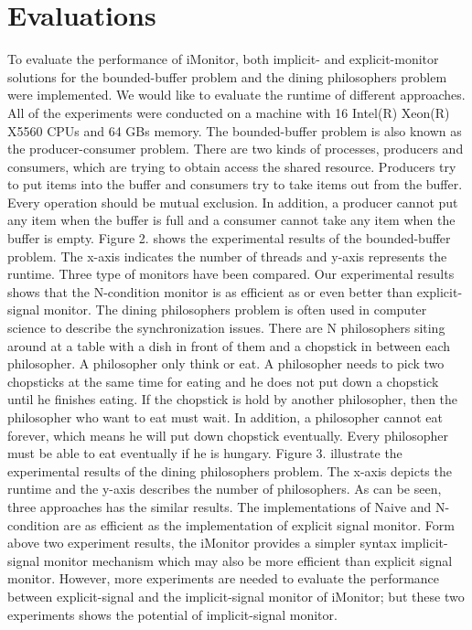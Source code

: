 \documentclass[preprint]{sigplanconf}
\begin{document}
\section{Evaluations} \label{sec:eval}
To evaluate the performance of iMonitor, both implicit- and explicit-monitor solutions for the bounded-buffer problem and the dining philosophers problem were implemented. We would like to evaluate the runtime of different approaches. All of the experiments were conducted on a machine with 16 Intel(R) Xeon(R) X5560 CPUs and 64 GBs memory. 
The bounded-buffer problem is also known as the producer-consumer problem. There are two kinds of processes, producers and consumers, which are trying to obtain access the shared resource. Producers try to put items into the buffer and consumers try to take items out from the buffer. Every operation should be mutual exclusion. In addition, a producer cannot put any item when the buffer is full and a consumer cannot take any item when the buffer is empty. Figure 2. shows the experimental results of the bounded-buffer problem. The x-axis indicates the number of threads and y-axis represents the runtime. Three type of monitors have been compared. Our experimental results shows that the N-condition monitor is as efficient as or even better than explicit-signal monitor. 
The dining philosophers problem is often used in computer science to describe the synchronization issues. There are N philosophers siting around at a table with a dish in front of them and a chopstick in between each philosopher. A philosopher only think or eat. A philosopher needs to pick two chopsticks at the same time for eating and he does not put down a chopstick until he finishes eating. If the chopstick is hold by another philosopher, then the philosopher who want to eat must wait. In addition, a philosopher 
cannot eat forever, which means he will put down chopstick eventually. Every philosopher must be able to eat eventually if he is hungary. Figure 3. illustrate the experimental results of the dining philosophers problem. The x-axis depicts the runtime and the y-axis describes the number of philosophers. As can be seen, three approaches has the similar results. The implementations of Naive and N-condition are as efficient as the implementation of explicit signal monitor. 
Form above two experiment results, the iMonitor provides a simpler syntax
implicit-signal monitor mechanism which may also be more efficient than
explicit signal monitor. However, more experiments are needed to evaluate the
performance between 
explicit-signal and the implicit-signal monitor of iMonitor; but these two experiments shows the potential of implicit-signal monitor.
\end{document}
